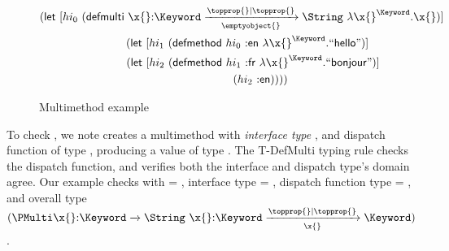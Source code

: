 \begin{figure}
\begin{gather*}
\letexp{hi_0} {\createmultiexp {\ArrowOne{\x{}}{\Keyword}{\String}{\filterset{\topprop{}}{\topprop{}}}{\emptyobject{}}} {\abs{\x{}}{\Keyword}{\x{}}}}
  {\\\text{\quad}
    \letexp{hi_1} {\extendmultiexp {hi_0} {\makekw{en}} {\abs {\x{}} {\Keyword} {\makestr{hello}}}}
      {\\\text{\quad\quad}
        \letexp{hi_2} {\extendmultiexp {hi_1} {\makekw{fr}} {\abs {\x{}} {\Keyword} {\makestr{bonjour}}}}
        {\\\text{\quad\quad\quad
          \appexp{hi_2}{\makekw{en}}}}}}
\end{gather*}
\caption{Multimethod example}
\label{main:figure:mmexample}
\end{figure}
%
%
%
%
To check 
{\createmultiexp {\ArrowTwo{\x{}}{\Keyword}{\String}} {\abs{\x{}}{\Keyword}{\x{}}}},
%
we note
{\createmultiexp {\s{}} {\e{}}} creates a multimethod with \emph{interface type} \s{}, and dispatch function \e{}
of type \sp{},
producing a value of type
{\MultiFntype {\s{}} {\sp{}}}. %
The T-DefMulti typing rule checks the dispatch function, and
verifies both the interface and dispatch type's domain agree.
Our example checks with \ty{} = \Keyword, interface type \s{} = {\ArrowTwo{\x{}}{\Keyword}{\String}},
dispatch function type \sp{} = {\ArrowOne{\x{}}{\Keyword}{\Keyword}{\filterset{\topprop{}}{\topprop{}}}{\x{}}}, and overall type
$
{\MultiFntype {\ArrowTwo{\x{}}{\Keyword}{\String}}
              {\ArrowOne{\x{}}{\Keyword}{\Keyword}{\filterset{\topprop{}}{\topprop{}}}{\x{}}}}
$.


